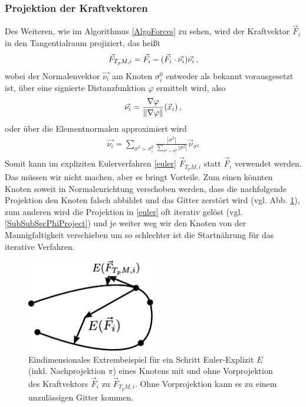   \subsubsection{Projektion der Kraftvektoren}
    Des Weiteren, wie im Algorithmus \ref{AlgoForces} zu sehen, wird der Kraftvektor \( \vec{F}_{i} \) in den Tangentialraum projiziert, das heißt
    \begin{align}
      \vec{F}_{T_{p}M,i} = \vec{F}_{i} - (\vec{F}_{i}\cdot\vec{\nu_{i}})\vec{\nu_{i}} \,\text{,}
    \end{align}
    wobei der Normalenvektor \( \vec{\nu_{i}}  \) am Knoten \( \sigma^{0}_{i} \) entweder als bekannt vorausgesetzt ist,
    über eine signierte Distanzfunktion \( \varphi \) ermittelt wird, also
    \begin{align}
      \vec{\nu_{i}} = \frac{\nabla\varphi}{\|\nabla\varphi\|}(\vec{x}_{i}) \,\text{,}
    \end{align}
    oder über die Elementnormalen approximiert wird
    \begin{align}
      \vec{\nu_{i}} = \sum_{\sigma^{2}\succ\sigma^{0}_{i}} \frac{|\sigma^{2}|}
                                                    {\sum_{\sigma^{2}\succ\sigma^{0}_{i}}|\sigma^{2}| } \vec{\nu}_{\sigma^{2}}
    \end{align}
    Somit kann im expliziten Eulerverfahren \eqref{euler} \( \vec{F}_{T_{p}M,i}\) statt \( \vec{F}_{i} \) verwendet werden.
    Das müssen wir nicht machen, aber es bringt Vorteile. 
    Zum einen könnten Knoten soweit in Normalenrichtung verschoben werden, dass die nachfolgende Projektion den Knoten falsch abbildet und das Gitter zerstört wird 
    (vgl. Abb. \ref{AbbFatalEuler}), zum anderen wird die Projektion in \eqref{euler} oft iterativ gelöst (vgl. \ref{SubSubSecPhiProject}) und je weiter weg wir den Knoten von der
    Mannigfaltigkeit verschieben um so schlechter ist die Startnährung für das iterative Verfahren.
    \begin{figure}
      \centering
      \includegraphics[width=0.5\textwidth]{bilder/meshCorrector/fatalEuler.eps}
      \caption[Euler mit und ohne Vorprojektion]{Eindimensionales Extrembeispiel für ein Schritt Euler-Explizit \( E \) (inkl. Nachprojektion \( \pi \))
                                                  eines Knotens mit und ohne Vorprojektion des Kraftvektors \( \vec{F}_{i} \)
                                                 zu \( \vec{F}_{T_{p}M,i}\). 
                                                 Ohne Vorprojektion kann es zu einem unzulässigen Gitter kommen.}
      \label{AbbFatalEuler}
    \end{figure}


